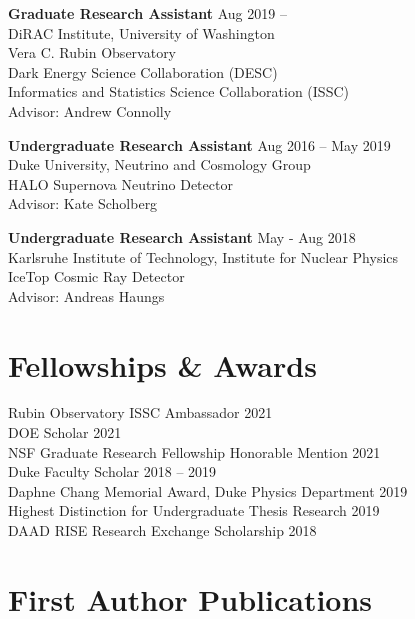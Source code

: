 \documentclass[margin]{res}
\begin{document}
\begin{resume}
\textbf{Graduate Research Assistant} \hfill Aug 2019 -- \\
DiRAC Institute, University of Washington \\
Vera C. Rubin Observatory \\
Dark Energy Science Collaboration (DESC) \\
Informatics and Statistics Science Collaboration (ISSC) \\
Advisor: Andrew Connolly

\textbf{Undergraduate Research Assistant} \hfill Aug 2016 -- May 2019 \\
Duke University, Neutrino and Cosmology Group \\
HALO Supernova Neutrino Detector \\
Advisor: Kate Scholberg 

\textbf{Undergraduate Research Assistant}  \hfill May - Aug 2018 \\
Karlsruhe Institute of Technology, Institute for Nuclear Physics \\
IceTop Cosmic Ray Detector \\
Advisor: Andreas Haungs

\section{Fellowships \& Awards}
Rubin Observatory ISSC Ambassador \hfill 2021 \\
DOE Scholar \hfill 2021 \\
NSF Graduate Research Fellowship Honorable Mention \hfill 2021 \\
Duke Faculty Scholar \hfill 2018 -- 2019 \\
Daphne Chang Memorial Award, Duke Physics Department \hfill 2019 \\
Highest Distinction for Undergraduate Thesis Research \hfill 2019 \\
DAAD RISE Research Exchange Scholarship \hfill 2018 \\

\section{First Author Publications}


\end{resume}
\end{document}
